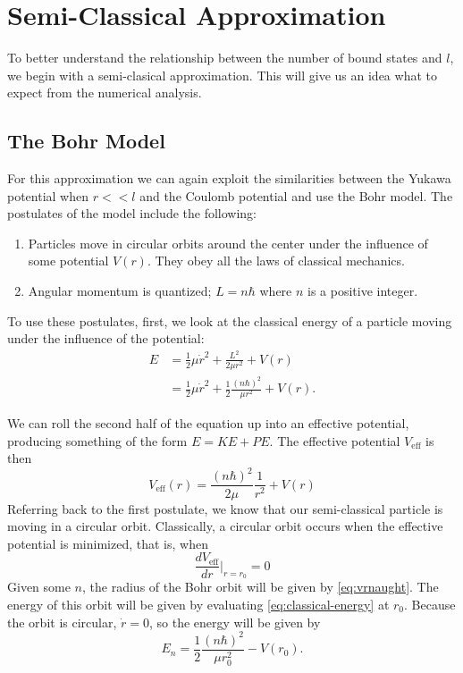 \documentclass[12pt,twoside]{reedthesis}
\newcommand{\eqn}[1]{\begin{equation}#1\end{equation}}
\newcommand{\eq}[1]{\begin{align}#1\end{align}}
\begin{document}
\clearpage %

\chapter{Semi-Classical Approximation}
To better understand the relationship between the number of bound states and $l$, we begin with a semi-clasical approximation. This will give us an idea what to expect from the numerical analysis.
\section{The Bohr Model}
For this approximation we can again exploit the similarities between the Yukawa potential when $r << l$ and the Coulomb potential and use the Bohr model. 
The postulates of the model include the following:
\begin{enumerate}
\item Particles move in circular orbits around the center under the influence of some potential $V(r)$. They obey all the laws of classical mechanics.
\item Angular momentum is quantized; $L = n\hbar$ where $n$ is a positive integer.
\end{enumerate}

To use these postulates, first, we look at the classical energy of a particle moving under the influence of the potential:
\eq{
E &= \frac{1}{2} \mu \dot{r}^2 + \frac{L^2}{2 \mu r^2} + V(r)\\
&= \frac{1}{2}\mu \dot{r}^2+\frac{1}{2}\frac{(n \hbar)^2}{\mu r^2}+V(r)\mbox{.}
\label{eq:classical-energy}
}

We can roll the second half of the equation up into an effective potential, producing something of the form $E = KE + PE$. The effective potential $V_{\mathrm{eff}}$ is then
\eqn{
V_{\mathrm{eff}}(r)=\frac{(n \hbar)^2}{2 \mu}\frac{1}{r^2}+V(r)
\label{eq:veff}
}
Referring back to the first postulate, we know that our semi-classical particle is moving in a circular orbit. Classically, a circular orbit occurs when the effective potential is minimized, that is, when
\eqn{
\frac{dV_{\mathrm{eff}}}{d r}\Big |_{r = r_0}= 0
\label{eq:vrnaught}
}
Given some $n$, the radius of the Bohr orbit will be given by \eqref{eq:vrnaught}. The energy of this orbit will be given by evaluating \eqref{eq:classical-energy}
 at $r_0$. Because the orbit is circular, $\dot{r} = 0$, so the energy will be given by
\eqn{
E_{n} = \frac{1}{2}\frac{(n\hbar)^2}{\mu r_0^2} - V(r_0)\mbox{.}
}
\end{document}

